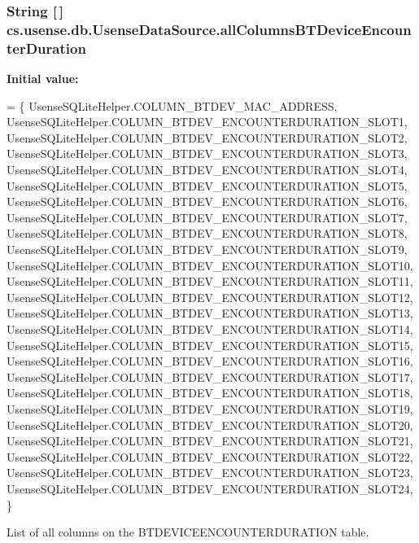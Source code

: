 \subsubsection[{all\+Columns\+B\+T\+Device\+Encounter\+Duration}]{\setlength{\rightskip}{0pt plus 5cm}String \mbox{[}$\,$\mbox{]} cs.\+usense.\+db.\+Usense\+Data\+Source.\+all\+Columns\+B\+T\+Device\+Encounter\+Duration\hspace{0.3cm}{\ttfamily [private]}}\label{classcs_1_1usense_1_1db_1_1_usense_data_source_ae0da67fa4d853379fe723ec28a581de0}
{\bfseries Initial value\+:}
\begin{DoxyCode}
= \{ 
            UsenseSQLiteHelper.COLUMN\_BTDEV\_MAC\_ADDRESS,
            UsenseSQLiteHelper.COLUMN\_BTDEV\_ENCOUNTERDURATION\_SLOT1,
            UsenseSQLiteHelper.COLUMN\_BTDEV\_ENCOUNTERDURATION\_SLOT2,
            UsenseSQLiteHelper.COLUMN\_BTDEV\_ENCOUNTERDURATION\_SLOT3,
            UsenseSQLiteHelper.COLUMN\_BTDEV\_ENCOUNTERDURATION\_SLOT4,
            UsenseSQLiteHelper.COLUMN\_BTDEV\_ENCOUNTERDURATION\_SLOT5,
            UsenseSQLiteHelper.COLUMN\_BTDEV\_ENCOUNTERDURATION\_SLOT6,
            UsenseSQLiteHelper.COLUMN\_BTDEV\_ENCOUNTERDURATION\_SLOT7,
            UsenseSQLiteHelper.COLUMN\_BTDEV\_ENCOUNTERDURATION\_SLOT8,
            UsenseSQLiteHelper.COLUMN\_BTDEV\_ENCOUNTERDURATION\_SLOT9,
            UsenseSQLiteHelper.COLUMN\_BTDEV\_ENCOUNTERDURATION\_SLOT10,
            UsenseSQLiteHelper.COLUMN\_BTDEV\_ENCOUNTERDURATION\_SLOT11,
            UsenseSQLiteHelper.COLUMN\_BTDEV\_ENCOUNTERDURATION\_SLOT12,
            UsenseSQLiteHelper.COLUMN\_BTDEV\_ENCOUNTERDURATION\_SLOT13,
            UsenseSQLiteHelper.COLUMN\_BTDEV\_ENCOUNTERDURATION\_SLOT14,
            UsenseSQLiteHelper.COLUMN\_BTDEV\_ENCOUNTERDURATION\_SLOT15,
            UsenseSQLiteHelper.COLUMN\_BTDEV\_ENCOUNTERDURATION\_SLOT16,
            UsenseSQLiteHelper.COLUMN\_BTDEV\_ENCOUNTERDURATION\_SLOT17,
            UsenseSQLiteHelper.COLUMN\_BTDEV\_ENCOUNTERDURATION\_SLOT18,
            UsenseSQLiteHelper.COLUMN\_BTDEV\_ENCOUNTERDURATION\_SLOT19,
            UsenseSQLiteHelper.COLUMN\_BTDEV\_ENCOUNTERDURATION\_SLOT20,
            UsenseSQLiteHelper.COLUMN\_BTDEV\_ENCOUNTERDURATION\_SLOT21,
            UsenseSQLiteHelper.COLUMN\_BTDEV\_ENCOUNTERDURATION\_SLOT22,
            UsenseSQLiteHelper.COLUMN\_BTDEV\_ENCOUNTERDURATION\_SLOT23,
            UsenseSQLiteHelper.COLUMN\_BTDEV\_ENCOUNTERDURATION\_SLOT24,
    \}
\end{DoxyCode}
List of all columns on the B\+T\+D\+E\+V\+I\+C\+E\+E\+N\+C\+O\+U\+N\+T\+E\+R\+D\+U\+R\+A\+T\+I\+O\+N table. \hypertarget{classcs_1_1usense_1_1db_1_1_usense_data_source_af5076f24e3994d5f0969f5ec40104f0f}{}

